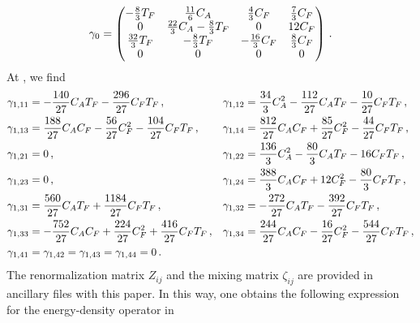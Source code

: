 \begin{equation}
	\gamma_0 =
	\begin{pmatrix}
		- \frac{8}{3} T_F & \frac{11}{6} C_A &
                \frac{4}{3} C_F & \frac{7}{3} C_F \\ 0 & \frac{22}{3}
                C_A - \frac{8}{3} T_F & 0 & 12 C_F
                \\ \frac{32}{3}  T_F & - \frac{8}{3}  T_F &
                - \frac{16}{3} C_F & \frac{8}{3} C_F \\ 0 & 0 & 0 & 0
	\end{pmatrix}\,.
\end{equation}
At \nnlo, we find
\begin{equation}
\begin{aligned}
		\gamma_{1, 1 1} &= - \frac{140}{27} C_A T_F -
                \frac{296}{27} C_F T_F\,,  & \gamma_{1, 1 2}
                &=  \frac{34}{3} C_A^2 - \frac{112}{27} C_A
                T_F - \frac{10}{27} C_F  T_F\,, \\
		\gamma_{1, 1 3} &=  \frac{188}{27} C_A C_F -
                \frac{56}{27} C_F^2 - \frac{104}{27} C_F T_F\,, &
                \gamma_{1, 1 4} &=  \frac{812}{27} C_A C_F +
                \frac{85}{27} C_F^2 - \frac{44}{27} C_F T_F\,, \\
		\gamma_{1, 2 1} &= 0\,, & \gamma_{1, 2 2} &=
                \frac{136}{3} C_A^2 - \frac{80}{3} C_A  T_F - 16 C_F
                T_F \,, \\
		\gamma_{1, 2 3} &= 0\,, & \gamma_{1, 2 4} &=
                \frac{388}{3} C_A  C_F + 12 C_F^2 - \frac{80}{3} C_F
                T_F\,, \\
		\gamma_{1, 3 1} &= \frac{560}{27} C_A  T_F +
                \frac{1184}{27} C_F   T_F\,, & \gamma_{1, 3 2} &=
                - \frac{272}{27} C_A  T_F - \frac{392}{27} C_F
                T_F\,, \\
		\gamma_{1, 3 3} &= - \frac{752}{27} C_A  C_F +
                \frac{224}{27} C_F^2 + \frac{416}{27} C_F   T_F\,, &
                \gamma_{1, 3 4} &= \frac{244}{27} C_A C_F -
                \frac{16}{27} C_F^2 - \frac{544}{27} C_F   T_F\,, \\
		\gamma_{1, 4 1} &= \gamma_{1, 4 2} = \gamma_{1, 4 3} =
                \gamma_{1, 4 4} = 0\,.
    \label{eq:}
\end{aligned}
\end{equation}
The renormalization matrix $Z_{ij}$ and the mixing matrix $\zeta_{ij}$
are provided in ancillary files with this paper. In this way, one
obtains the following expression for the energy-density operator in
